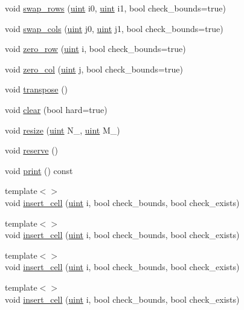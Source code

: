 \begin{DoxyCompactItemize}
\item 
void \hyperlink{class_b_array_a742773803481c18e2865b2b2a1e68949}{swap\+\_\+rows} (\hyperlink{typedefs_8hpp_a91ad9478d81a7aaf2593e8d9c3d06a14}{uint} i0, \hyperlink{typedefs_8hpp_a91ad9478d81a7aaf2593e8d9c3d06a14}{uint} i1, bool check\+\_\+bounds=true)
\item 
void \hyperlink{class_b_array_ae94f7e61ca5985244968d9daf2859229}{swap\+\_\+cols} (\hyperlink{typedefs_8hpp_a91ad9478d81a7aaf2593e8d9c3d06a14}{uint} j0, \hyperlink{typedefs_8hpp_a91ad9478d81a7aaf2593e8d9c3d06a14}{uint} j1, bool check\+\_\+bounds=true)
\item 
void \hyperlink{class_b_array_a411085fcb7530669c72d9847340f1bac}{zero\+\_\+row} (\hyperlink{typedefs_8hpp_a91ad9478d81a7aaf2593e8d9c3d06a14}{uint} i, bool check\+\_\+bounds=true)
\item 
void \hyperlink{class_b_array_a0fa473027d00ec53ed08eaea03ac3ef7}{zero\+\_\+col} (\hyperlink{typedefs_8hpp_a91ad9478d81a7aaf2593e8d9c3d06a14}{uint} j, bool check\+\_\+bounds=true)
\item 
void \hyperlink{class_b_array_a0284f7f2148b7c1b474ebe01f6548b98}{transpose} ()
\item 
void \hyperlink{class_b_array_a6dd5ebff333b376c6fb569e48290935f}{clear} (bool hard=true)
\item 
void \hyperlink{class_b_array_aefe411fe1890273518bfbc3f8ca616ce}{resize} (\hyperlink{typedefs_8hpp_a91ad9478d81a7aaf2593e8d9c3d06a14}{uint} N\+\_\+, \hyperlink{typedefs_8hpp_a91ad9478d81a7aaf2593e8d9c3d06a14}{uint} M\+\_\+)
\item 
void \hyperlink{class_b_array_a5eacd388e3d0f638f2c35b6e0f0c490c}{reserve} ()
\item 
void \hyperlink{class_b_array_a9d150c44b23cf1e4af45f540508db1de}{print} () const
\item 
{\footnotesize template$<$$>$ }\\void \hyperlink{class_b_array_a65aaf8f78714cd94616cf826b3eef6e1}{insert\+\_\+cell} (\hyperlink{typedefs_8hpp_a91ad9478d81a7aaf2593e8d9c3d06a14}{uint} i, bool check\+\_\+bounds, bool check\+\_\+exists)
\item 
{\footnotesize template$<$$>$ }\\void \hyperlink{class_b_array_a9a554db909a326d9110caa1d050f33e4}{insert\+\_\+cell} (\hyperlink{typedefs_8hpp_a91ad9478d81a7aaf2593e8d9c3d06a14}{uint} i, bool check\+\_\+bounds, bool check\+\_\+exists)
\item 
{\footnotesize template$<$$>$ }\\void \hyperlink{class_b_array_a65aaf8f78714cd94616cf826b3eef6e1}{insert\+\_\+cell} (\hyperlink{typedefs_8hpp_a91ad9478d81a7aaf2593e8d9c3d06a14}{uint} i, bool check\+\_\+bounds, bool check\+\_\+exists)
\item 
{\footnotesize template$<$$>$ }\\void \hyperlink{class_b_array_a9a554db909a326d9110caa1d050f33e4}{insert\+\_\+cell} (\hyperlink{typedefs_8hpp_a91ad9478d81a7aaf2593e8d9c3d06a14}{uint} i, bool check\+\_\+bounds, bool check\+\_\+exists)
\end{DoxyCompactItemize}
